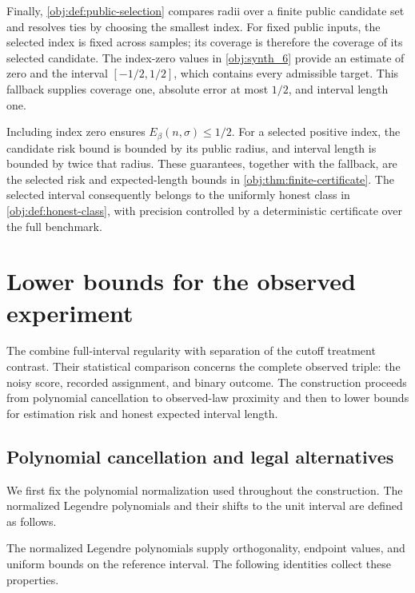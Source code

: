 \documentclass[11pt]{article}
\begin{document}
Finally, \cref{obj:def:public-selection} compares radii over a finite public candidate set and resolves ties by choosing the smallest index. For fixed public inputs, the selected index is fixed across samples; its coverage is therefore the coverage of its selected candidate. The index-zero values in \cref{obj:synth_6} provide an estimate of zero and the interval \([-1/2,1/2]\), which contains every admissible target. This fallback supplies coverage one, absolute error at most \(1/2\), and interval length one.

Including index zero ensures \(E_\beta(n,\sigma)\le1/2\). For a selected positive index, the candidate risk bound is bounded by its public radius, and interval length is bounded by twice that radius. These guarantees, together with the fallback, are the selected risk and expected-length bounds in \cref{obj:thm:finite-certificate}. The selected interval consequently belongs to the uniformly honest class in \cref{obj:def:honest-class}, with precision controlled by a deterministic certificate over the full benchmark.


\section{Lower bounds for the observed experiment}

The  combine full-interval regularity with separation of the cutoff treatment contrast. Their statistical comparison concerns the complete observed triple: the noisy score, recorded assignment, and binary outcome. The construction proceeds from polynomial cancellation to observed-law proximity and then to lower bounds for estimation risk and honest expected interval length.

\subsection{Polynomial cancellation and legal alternatives}

We first fix the polynomial normalization used throughout the construction. The normalized Legendre polynomials  and their shifts to the unit interval are defined as follows.



The normalized Legendre polynomials  supply orthogonality, endpoint values, and uniform bounds on the reference interval. The following identities collect these properties.
\end{document}
